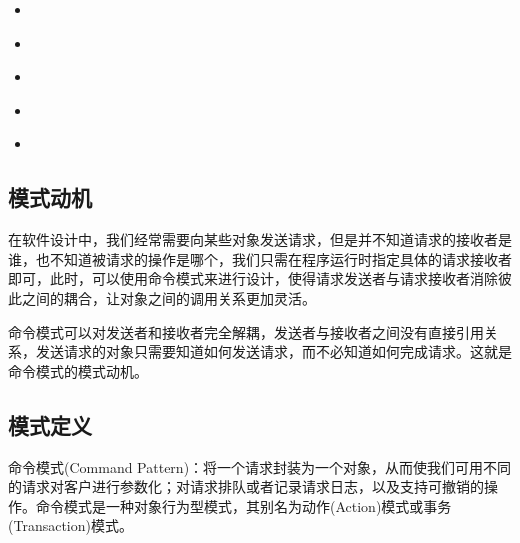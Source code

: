 \documentclass[letterpaper,10pt,english]{sphinxmanual}
\begin{document}
\begin{sphinxShadowBox}
\begin{itemize}
\begin{itemize}
\item {} 
\sphinxAtStartPar
{}\label{\detokenize{behavioral_patterns/command:id25}}{\hyperref[\detokenize{behavioral_patterns/command:id11}]{}}

\item {} 
\sphinxAtStartPar
{}\label{\detokenize{behavioral_patterns/command:id26}}{\hyperref[\detokenize{behavioral_patterns/command:id12}]{}}

\item {} 
\sphinxAtStartPar
{}\label{\detokenize{behavioral_patterns/command:id27}}{\hyperref[\detokenize{behavioral_patterns/command:id13}]{}}

\item {} 
\sphinxAtStartPar
{}\label{\detokenize{behavioral_patterns/command:id28}}{\hyperref[\detokenize{behavioral_patterns/command:id14}]{}}

\item {} 
\sphinxAtStartPar
{}\label{\detokenize{behavioral_patterns/command:id29}}{\hyperref[\detokenize{behavioral_patterns/command:id15}]{}}

\end{itemize}

\end{itemize}
\end{sphinxShadowBox}


\subsection{模式动机}
\label{\detokenize{behavioral_patterns/command:id3}}
\sphinxAtStartPar
在软件设计中，我们经常需要向某些对象发送请求，但是并不知道请求的接收者是谁，也不知道被请求的操作是哪个，我们只需在程序运行时指定具体的请求接收者即可，此时，可以使用命令模式来进行设计，使得请求发送者与请求接收者消除彼此之间的耦合，让对象之间的调用关系更加灵活。

\sphinxAtStartPar
命令模式可以对发送者和接收者完全解耦，发送者与接收者之间没有直接引用关系，发送请求的对象只需要知道如何发送请求，而不必知道如何完成请求。这就是命令模式的模式动机。


\subsection{模式定义}
\label{\detokenize{behavioral_patterns/command:id4}}
\sphinxAtStartPar
命令模式(Command Pattern)：将一个请求封装为一个对象，从而使我们可用不同的请求对客户进行参数化；对请求排队或者记录请求日志，以及支持可撤销的操作。命令模式是一种对象行为型模式，其别名为动作(Action)模式或事务(Transaction)模式。
\end{document}
